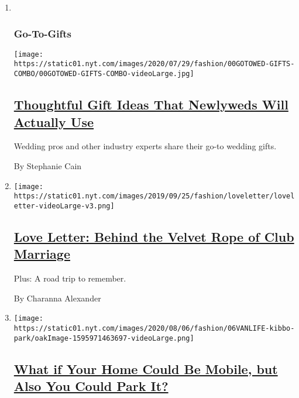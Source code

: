 \begin{enumerate}
\def\labelenumi{\arabic{enumi}.}
\item ~
  \hypertarget{go-to-gifts}{%
  \subsubsection{Go-To-Gifts}\label{go-to-gifts}}

  \texttt{[image: https://static01.nyt.com/images/2020/07/29/fashion/00GOTOWED-GIFTS-COMBO/00GOTOWED-GIFTS-COMBO-videoLarge.jpg]}

  \hypertarget{thoughtful-gift-ideas-that-newlyweds-will-actually-use}{%
  \subsection{\texorpdfstring{\href{/2020/08/08/fashion/weddings/thoughtful-gift-ideas-that-newlyweds-will-actually-use.html}{Thoughtful
  Gift Ideas That Newlyweds Will Actually
  Use}}{Thoughtful Gift Ideas That Newlyweds Will Actually Use}}\label{thoughtful-gift-ideas-that-newlyweds-will-actually-use}}

  Wedding pros and other industry experts share their go-to wedding
  gifts.

  By Stephanie Cain
\item
  \texttt{[image: https://static01.nyt.com/images/2019/09/25/fashion/loveletter/loveletter-videoLarge-v3.png]}

  \hypertarget{love-letter-behind-the-velvet-rope-of-club-marriage}{%
  \subsection{\texorpdfstring{\href{/2020/08/07/style/love-letter-newsletter-behind-the-velvet-rope-of-club-marriage.html}{Love
  Letter: Behind the Velvet Rope of Club
  Marriage}}{Love Letter: Behind the Velvet Rope of Club Marriage}}\label{love-letter-behind-the-velvet-rope-of-club-marriage}}

  Plus: A road trip to remember.

  By Charanna Alexander
\item
  \texttt{[image: https://static01.nyt.com/images/2020/08/06/fashion/06VANLIFE-kibbo-park/oakImage-1595971463697-videoLarge.png]}

  \hypertarget{what-if-your-home-could-be-mobile-but-also-you-could-park-it}{%
  \subsection{\texorpdfstring{\href{/2020/08/07/style/kibbo-van-life-startup.html}{What
  if Your Home Could Be Mobile, but Also You Could Park
  It?}}{What if Your Home Could Be Mobile, but Also You Could Park It?}}\label{what-if-your-home-could-be-mobile-but-also-you-could-park-it}}


\end{enumerate}
